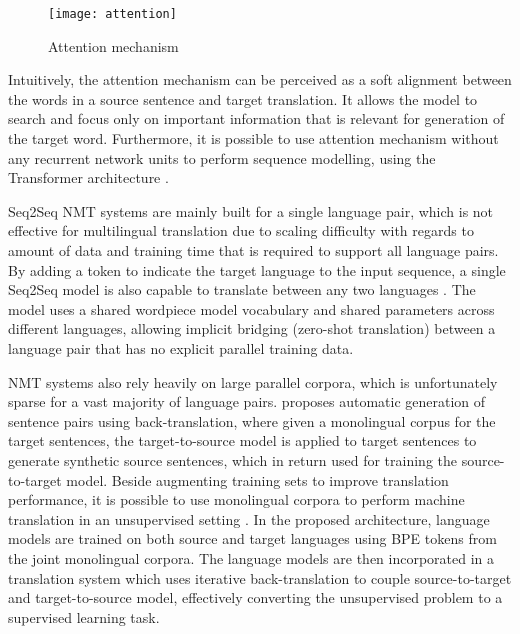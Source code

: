 \documentclass[12pt]{extarticle}
\begin{document}
\begin{figure}[ht]
\centering
\texttt{[image: attention]}
\caption{Attention mechanism}
\label{fig:attention}
\end{figure}

Intuitively, the attention mechanism can be perceived as a soft alignment between the words in a source sentence and target translation. It allows the model to search and focus only on important information that is relevant for generation of the target word. Furthermore, it is possible to use attention mechanism without any recurrent network units to perform sequence modelling, using the Transformer architecture \citep{NIPS2017_7181}.%

Seq2Seq NMT systems are mainly built for a single language pair, which is not effective for multilingual translation due to scaling difficulty with regards to amount of data and training time that is required to support all language pairs. By adding a token to indicate the target language to the input sequence, a single Seq2Seq model is also capable to translate between any two languages \citep{johnson-etal-2017-googles}. The model uses a shared wordpiece model vocabulary \citep{wordpiece} and shared parameters across different languages, allowing implicit bridging (zero-shot translation) between a language pair that has no explicit parallel training data.

NMT systems also rely heavily on large parallel corpora, which is unfortunately sparse for a vast majority of language pairs. \citep{sennrich-etal-2016-improving} proposes automatic generation of sentence pairs using back-translation, where given a monolingual corpus for the target sentences, the target-to-source model is applied to target sentences to generate synthetic source sentences, which in return used for training the source-to-target model. Beside augmenting training sets to improve translation performance, it is possible to use monolingual corpora to perform machine translation in an unsupervised setting \citep{lample-etal-2018-phrase}. In the proposed architecture, language models are trained on both source and target languages using BPE \citep{sennrich-etal-2016-neural} tokens from the joint monolingual corpora. The language models are then incorporated in a translation system which uses iterative back-translation to couple source-to-target and target-to-source model, effectively converting the unsupervised problem to a supervised learning task. 
\end{document}
